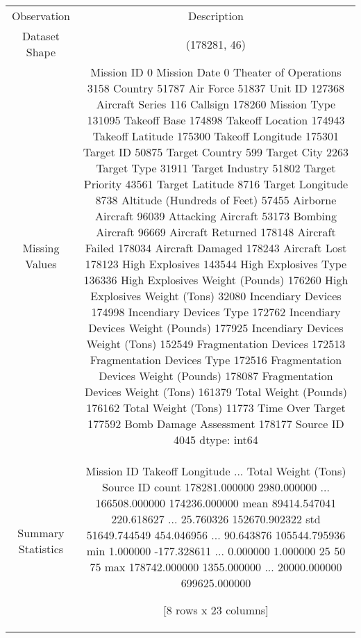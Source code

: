 \begin{tabular}{cc}
Observation & Description \\
Dataset Shape & (178281, 46) \\
Missing Values & Mission ID                                    0
Mission Date                                  0
Theater of Operations                      3158
Country                                   51787
Air Force                                 51837
Unit ID                                  127368
Aircraft Series                             116
Callsign                                 178260
Mission Type                             131095
Takeoff Base                             174898
Takeoff Location                         174943
Takeoff Latitude                         175300
Takeoff Longitude                        175301
Target ID                                 50875
Target Country                              599
Target City                                2263
Target Type                               31911
Target Industry                           51802
Target Priority                           43561
Target Latitude                            8716
Target Longitude                           8738
Altitude (Hundreds of Feet)               57455
Airborne Aircraft                         96039
Attacking Aircraft                        53173
Bombing Aircraft                          96669
Aircraft Returned                        178148
Aircraft Failed                          178034
Aircraft Damaged                         178243
Aircraft Lost                            178123
High Explosives                          143544
High Explosives Type                     136336
High Explosives Weight (Pounds)          176260
High Explosives Weight (Tons)             32080
Incendiary Devices                       174998
Incendiary Devices Type                  172762
Incendiary Devices Weight (Pounds)       177925
Incendiary Devices Weight (Tons)         152549
Fragmentation Devices                    172513
Fragmentation Devices Type               172516
Fragmentation Devices Weight (Pounds)    178087
Fragmentation Devices Weight (Tons)      161379
Total Weight (Pounds)                    176162
Total Weight (Tons)                       11773
Time Over Target                         177592
Bomb Damage Assessment                   178177
Source ID                                  4045
dtype: int64 \\
Summary Statistics &           Mission ID  Takeoff Longitude  ...  Total Weight (Tons)      Source ID
count  178281.000000        2980.000000  ...        166508.000000  174236.000000
mean    89414.547041         220.618627  ...            25.760326  152670.902322
std     51649.744549         454.046956  ...            90.643876  105544.795936
min         1.000000        -177.328611  ...             0.000000       1.000000
25%
50%
75%
max    178742.000000        1355.000000  ...         20000.000000  699625.000000

[8 rows x 23 columns] \\
\end{tabular}